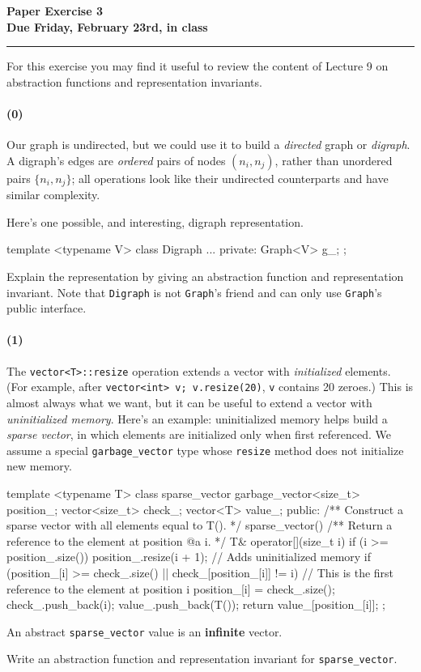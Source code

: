 \documentclass[12pt,letterpaper,twoside]{article}
\begin{document}
{\centering \textbf{Paper Exercise 3\\ Due Friday, February 23rd, in class \\}}
\vspace*{-8pt}\noindent\rule{\linewidth}{1pt}

For this exercise you may find it useful to review the content of Lecture 9 on abstraction functions and representation invariants.

\paragraph{(0)} Our graph is undirected, but we could use it to build a
\emph{directed} graph or \emph{digraph}. A digraph's edges are \emph{ordered}
pairs of nodes $(n_i, n_j)$, rather than unordered pairs $\{n_i, n_j\}$; all
operations look like their undirected counterparts and have similar complexity.

Here's one possible, and interesting, digraph representation.
\begin{cpp}
template <typename V> 
class Digraph { 
  ... 
 private:
  Graph<V> g_;
};
\end{cpp}
Explain the representation by giving an abstraction function and representation invariant. Note that \texttt{Digraph} is not \texttt{Graph}'s friend and can only use \texttt{Graph}'s public interface.


\paragraph{(1)} The \texttt{vector<T>::resize} operation extends a vector with
\emph{initialized} elements. (For example, after \texttt{vector<int> v;
  v.resize(20)}, \texttt{v} contains 20 zeroes.) This is almost always what we
want, but it can be useful to extend a vector with \emph{uninitialized
  memory}. Here's an example: uninitialized memory helps build a \emph{sparse
  vector}, in which elements are initialized only when first referenced. We
assume a special \texttt{garbage\_vector} type whose \texttt{resize} method does
not initialize new memory.

\begin{cpp}
template <typename T> 
class sparse_vector {
  garbage_vector<size_t> position_;
  vector<size_t> check_;
  vector<T> value_;
 public:
  /** Construct a sparse vector with all elements equal to T(). */
  sparse_vector() {
  }
  /** Return a reference to the element at position @a i. */
  T& operator[](size_t i) {
    if (i >= position_.size())
      position_.resize(i + 1);   // Adds uninitialized memory
    if (position_[i] >= check_.size() || check_[position_[i]] != i) {
      // This is the first reference to the element at position i
      position_[i] = check_.size();
      check_.push_back(i);
      value_.push_back(T());
    }
    return value_[position_[i]];
  }
};
\end{cpp}

An abstract \texttt{sparse\_vector} value is an \textbf{infinite} vector.

Write an abstraction function and representation invariant for
\texttt{sparse\_vector}.
\end{document}
